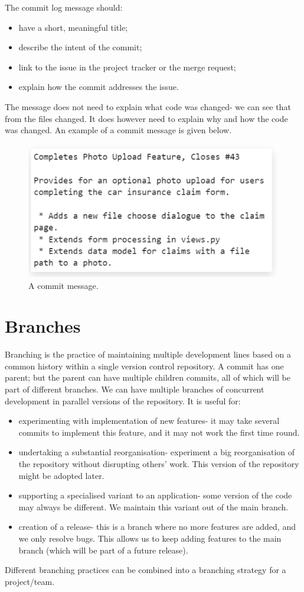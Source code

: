 \documentclass[a4paper, openany]{memoir}
\begin{document}
The commit log message should:
\begin{itemize}
    \item have a short, meaningful title;
    \item describe the intent of the commit;
    \item link to the issue in the project tracker or the merge request;
    \item explain how the commit addresses the issue.
\end{itemize}
The message does not need to explain what code was changed- we can see that from the files changed. It does however need to explain why and how the code was changed. An example of a commit message is given below.
\begin{figure}[H]
    \centering
    \includegraphics[scale=0.7]{src/3.11 CommitExample.PNG}
    \caption{A commit message.}
\end{figure}


\section{Branches}
Branching is the practice of maintaining multiple development lines based on a common history within a single version control repository. A commit has one parent; but the parent can have multiple children commits, all of which will be part of different branches. We can have multiple branches of concurrent development in parallel versions of the repository. It is useful for:
\begin{itemize}
    \item experimenting with implementation of new features- it may take several commits to implement this feature, and it may not work the first time round.
    \item undertaking a substantial reorganisation- experiment a big reorganisation of the repository without disrupting others' work. This version of the repository might be adopted later.
    \item supporting a specialised variant to an application- some version of the code may always be different. We maintain this variant out of the main branch.
    \item creation of a release- this is a branch where no more features are added, and we only resolve bugs. This allows us to keep adding features to the main branch (which will be part of a future release).
\end{itemize}
Different branching practices can be combined into a branching strategy for a project/team.
\end{document}
